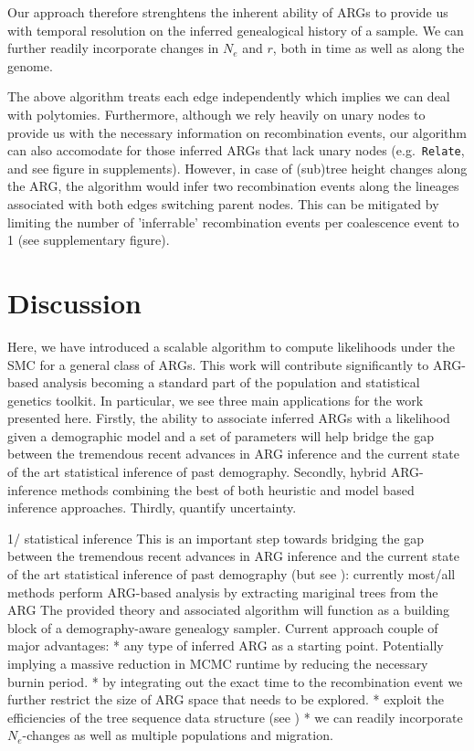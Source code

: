 \documentclass{article}
\newcommand{\relate}[0]{\texttt{Relate}}
\begin{document}
Our approach therefore strenghtens the inherent ability of ARGs to provide us with temporal 
resolution on the inferred genealogical history of a sample. 
We can further readily incorporate changes in $N_e$ and $r$, 
both in time as well as along the genome.

The above algorithm treats each edge independently which implies we can deal with polytomies.
Furthermore, although we rely heavily on unary nodes to provide us with the necessary 
information on recombination events, our algorithm can also accomodate for 
those inferred ARGs that lack unary nodes (e.g.\ \relate, and see figure in supplements).
However, in case of (sub)tree height changes along the ARG, the algorithm would infer 
two recombination events along the lineages associated 
with both edges switching parent nodes. This can be mitigated by limiting the number of 
'inferrable' recombination events per coalescence event to 1 (see supplementary figure). 


\section{Discussion}
Here, we have introduced a scalable algorithm to compute likelihoods 
under the SMC for a general class of ARGs. This work will contribute significantly 
to ARG-based analysis becoming a standard part of the population 
and statistical genetics toolkit. 
In particular, we see three main applications for the work presented here. 
Firstly, the ability to associate inferred ARGs with a likelihood given a demographic 
model and a set of parameters will help bridge the gap between the tremendous recent 
advances in ARG inference and the current state of the art statistical inference of 
past demography. Secondly, hybrid ARG-inference methods combining the best of both 
heuristic and model based inference approaches. Thirdly, quantify uncertainty.

1/ statistical inference
This is an important step towards bridging the gap between the tremendous 
recent advances in ARG inference and the current state of the art statistical inference of 
past demography (but see ): currently most/all methods perform ARG-based analysis 
by extracting mariginal trees from the ARG \citep{hejase_2022} %
The provided theory and associated algorithm will function as a building block of a 
demography-aware genealogy sampler. Current approach couple of major advantages:
* any type of inferred ARG as a starting point. Potentially implying a massive reduction in 
MCMC runtime by reducing the necessary burnin period.
* by integrating out the exact time to the recombination event we further restrict the size 
of ARG space that needs to be explored.
* exploit the efficiencies of the tree sequence data structure (see \citep{Mahmoudi_bayesian_2022})
* we can readily incorporate $N_e$-changes as well as multiple populations and migration.\\
\end{document}

